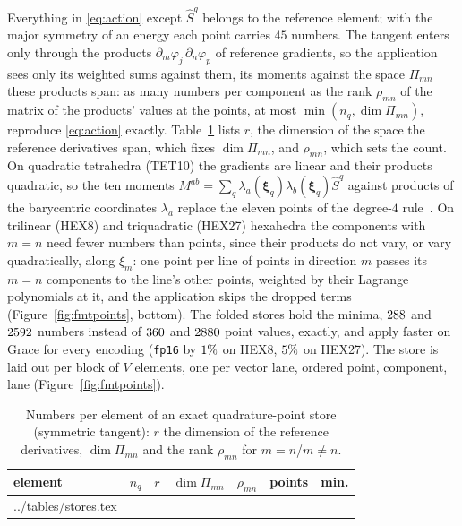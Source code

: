 \documentclass[sigconf,review]{acmart}
\makeatletter
\newcommand{\rows}[1]{\@@input #1 }
\newcommand{\xhat}{\boldsymbol{\xi}}
\newcommand{\Sq}{\widehat{S}^{q}}
\newcommand{\Mab}{M^{ab}}
\makeatother
\begin{document}
Everything in \eqref{eq:action} except $\Sq$ belongs to the reference element; with the major
symmetry of an energy each point carries $45$ numbers.  The tangent enters only through the products
$\partial_m\varphi_j\,\partial_n\varphi_p$ of reference gradients, so the application sees only its
weighted sums against them, its moments against the space $\Pi_{mn}$ these products span: as many
numbers per component as the rank $\rho_{mn}$ of the matrix of the products' values at the points,
at most $\min(n_q,\dim\Pi_{mn})$, reproduce \eqref{eq:action} exactly.  Table~\ref{tab:stores} lists
$r$, the dimension of the space the reference derivatives span, which fixes $\dim\Pi_{mn}$, and
$\rho_{mn}$, which sets the count.  On quadratic tetrahedra
(TET10) the gradients are linear and their products quadratic, so the ten moments
$\Mab=\sum_q\lambda_a(\xhat_q)\lambda_b(\xhat_q)\Sq$ against products of the barycentric coordinates
$\lambda_a$ replace the eleven points of the degree-$4$ rule~\cite{Keast1986}.  On trilinear (HEX8) and
triquadratic (HEX27) hexahedra the components with $m=n$ need fewer numbers than points, since their
products do not vary, or vary quadratically, along $\xi_m$: one point per line of points in
direction $m$ passes its $m=n$ components to the line's other points, weighted by their Lagrange
polynomials at it, and the application skips the dropped terms (Figure~\ref{fig:fmtpoints}, bottom).  The folded
stores hold the minima,
$288$ and $2592$ numbers instead of $360$ and
$2880$ point values, exactly, and apply faster on Grace for every encoding
(\texttt{fp16} by $1\%$ on HEX8, $5\%$ on HEX27).
The store is laid out per
block of $V$ elements, one per vector lane, ordered point, component, lane
(Figure~\ref{fig:fmtpoints}).

\begin{table}[t]
\centering
\small
\setlength{\tabcolsep}{3.5pt}
\begin{tabular}{lrrrrrr}
\toprule
element & $n_q$ & $r$ & $\dim\Pi_{mn}$ & $\rho_{mn}$ & points & min. \\
\midrule
\rows{../tables/stores.tex}
\bottomrule
\end{tabular}
\caption{Numbers per element of an exact quadrature-point store (symmetric tangent): $r$ the
dimension of the reference derivatives, $\dim\Pi_{mn}$ and the rank $\rho_{mn}$ for $m=n$/$m\ne n$.}
\label{tab:stores}
\end{table}
\end{document}
